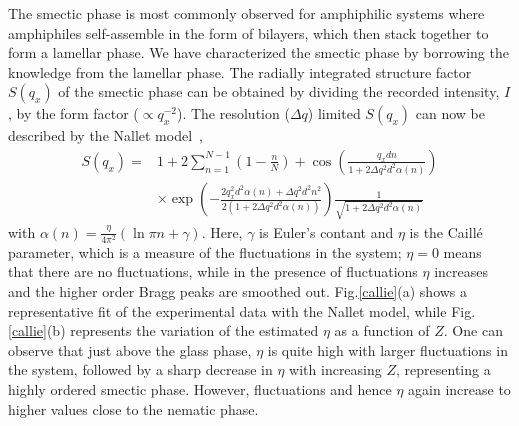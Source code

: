 \documentclass[aps,prl,preprint,superscriptaddress,showkeys]{revtex4-2} %
\begin{document}
The smectic phase is most commonly observed for amphiphilic systems where amphiphiles self-assemble in the form of bilayers, which then stack together to form a lamellar phase. We have characterized the smectic phase by borrowing the knowledge from the lamellar phase. The radially integrated structure factor $S(q_x)$ of the smectic phase can be obtained by dividing the recorded intensity, $I$, by the form factor ($\propto q_x^{-2}$). The resolution ($\Delta q$) limited $S(q_x)$ can now be described by the Nallet model~\cite{nallet1993modelling}, 
\begin{equation}
\label{eq1:}
\begin{split}
S(q_x) = &1+2\sum_{n=1}^{N-1} (1-\frac{n}{N}) +\cos(\frac{q_x d n}{1+2\Delta q^2 d^2 \alpha(n)})\\
&\times\exp(-\frac{2q_x^2 d^2\alpha(n)+\Delta q^2 d^2 n^2}{2(1+2\Delta q^2 d^2 \alpha(n))})\frac{1}{\sqrt{1+2\Delta q^2 d^2 \alpha (n)}}
\end{split}
\end{equation}
\noindent with $\alpha(n)=\frac{\eta}{4\pi^2}(\ln \pi n + \gamma)$. Here, $\gamma$ is Euler's contant and $\eta$ is the Caill\'{e} parameter, which is a measure of the fluctuations in the system; $\eta=0$ means that there are no fluctuations, while in the presence of fluctuations $\eta$ increases and the higher order Bragg peaks are smoothed out. Fig.\ref{callie}(a) shows a representative fit of the experimental data with the Nallet model, while Fig.\ref{callie}(b) represents the variation of the estimated $\eta$ as a function of $Z$. One can observe that just above the glass phase, $\eta$ is quite high with larger fluctuations in the system, followed by a sharp decrease in $\eta$ with increasing $Z$, representing a highly ordered smectic phase. However, fluctuations and hence $\eta$ again increase to higher values close to the nematic phase.\par  
\end{document}
